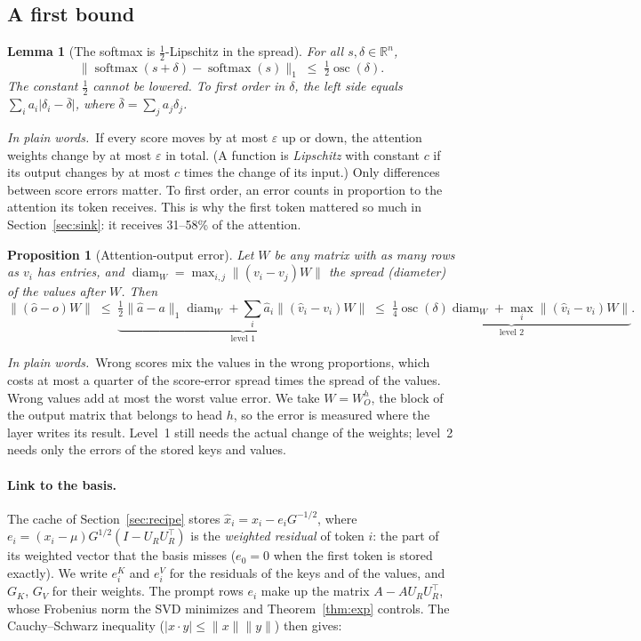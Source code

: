 \documentclass[10pt]{article}
\theoremstyle{plain}
\newtheorem{lemma}[theorem]{Lemma}
\newtheorem{proposition}[theorem]{Proposition}
\theoremstyle{definition}
\theoremstyle{remark}
\newcommand{\R}{\mathbb{R}}
\newcommand{\T}{^{\top}}
\newcommand{\norm}[1]{\lVert #1\rVert}
\DeclareMathOperator{\osc}{osc}
\newcommand{\softmax}{\operatorname{softmax}}
\newcommand{\plain}{\noindent\emph{In plain words.}\ }
\begin{document}
\subsection{A first bound}
\label{sec:bound1}

\begin{lemma}[The softmax is $\tfrac12$-Lipschitz in the spread]\label{lem:softmax}
For all $s,\delta\in\R^n$,
\[
\lVert\softmax(s+\delta)-\softmax(s)\rVert_1\;\le\;\tfrac12\osc(\delta).
\]
The constant $\tfrac12$ cannot be lowered. To first order in $\delta$, the left side equals $\sum_ia_i\lvert\delta_i-\bar\delta\rvert$, where $\bar\delta=\sum_ja_j\delta_j$.
\end{lemma}

\plain If every score moves by at most $\varepsilon$ up or down, the attention weights change by at most $\varepsilon$ in total. (A function is \emph{Lipschitz} with constant $c$ if its output changes by at most $c$ times the change of its input.) Only differences between score errors matter. To first order, an error counts in proportion to the attention its token receives. This is why the first token mattered so much in Section~\ref{sec:sink}: it receives 31--58\% of the attention.

\begin{proposition}[Attention-output error]\label{prop:attnout}
Let $W$ be any matrix with as many rows as $v_i$ has entries, and $\operatorname{diam}_W=\max_{i,j}\lVert(v_i-v_j)W\rVert$ the spread (diameter) of the values after $W$. Then
\[
\lVert(\hat o-o)W\rVert\;\le\;\underbrace{\tfrac12\lVert\hat a-a\rVert_1\operatorname{diam}_W+\sum_i\hat a_i\lVert(\hat v_i-v_i)W\rVert}_{\text{level 1}}
\;\le\;\underbrace{\tfrac14\osc(\delta)\operatorname{diam}_W+\max_i\lVert(\hat v_i-v_i)W\rVert}_{\text{level 2}} .
\]
\end{proposition}

\plain Wrong scores mix the values in the wrong proportions, which costs at most a quarter of the score-error spread times the spread of the values. Wrong values add at most the worst value error. We take $W=W_O^h$, the block of the output matrix that belongs to head $h$, so the error is measured where the layer writes its result. Level~1 still needs the actual change of the weights; level~2 needs only the errors of the stored keys and values.

\paragraph{Link to the basis.}
The cache of Section~\ref{sec:recipe} stores $\hat x_i=x_i-e_iG^{-1/2}$, where $e_i=(x_i-\mu)G^{1/2}(I-U_RU_R\T)$ is the \emph{weighted residual} of token $i$: the part of its weighted vector that the basis misses ($e_0=0$ when the first token is stored exactly). We write $e_i^K$ and $e_i^V$ for the residuals of the keys and of the values, and $G_K$, $G_V$ for their weights. The prompt rows $e_i$ make up the matrix $A-AU_RU_R\T$, whose Frobenius norm the SVD minimizes and Theorem~\ref{thm:exp} controls. The Cauchy--Schwarz inequality ($\lvert x\cdot y\rvert\le\norm x\norm y$) then gives:
\end{document}
